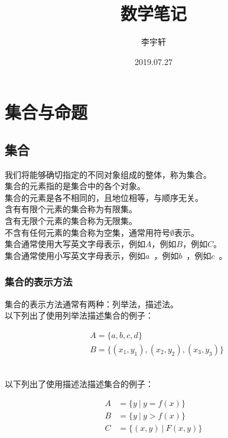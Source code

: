 \documentclass[UTF8]{ctexart}
\title{数学笔记}
\author{李宇轩}
\date{2019.07.27}
\begin{document}

\maketitle

\newpage

\tableofcontents

\newpage

\setlength{\parindent}{0pt}

\section{集合与命题}

\subsection{集合}
    我们将能够确切指定的不同对象组成的整体，称为集合。\\[3mm]
    集合的元素指的是集合中的各个对象。\\[3mm]
    集合的元素是各不相同的，且地位相等，与顺序无关。\\[6mm]
    含有有限个元素的集合称为有限集。\\[3mm]
    含有无限个元素的集合称为无限集。\\[3mm]
    不含有任何元素的集合称为空集，通常用符号$\emptyset$表示。\\[6mm]
    集合通常使用大写英文字母表示，例如$A$，例如$B$，例如$C$。\\[3mm]
    集合通常使用小写英文字母表示，例如$a$~，例如$b$~，例如$c$~。\\

\subsubsection{集合的表示方法}
    集合的表示方法通常有两种：列举法，描述法。\\[3mm]
    以下列出了使用列举法描述集合的例子：
    \begin{large}
        \begin{align*}
            &A=\big\{ a,b,c,d\big\}\\[3mm]
            &B=\big\{ (x_1,y_1),(x_2,y_2),(x_3,y_3) \big\}
        \end{align*}
    \end{large}\\
    以下列出了使用描述法描述集合的例子：
    \begin{large}
        \begin{align*}
            A&=\big\{ y~|~y=f(x)\big\}\\[3mm]
            B&=\big\{ y~|~y>f(x)\big\}\\[3mm]
            C&=\big\{ (x,y)~|~F(x,y)\big\}
        \end{align*}
    \end{large}
\end{document}
